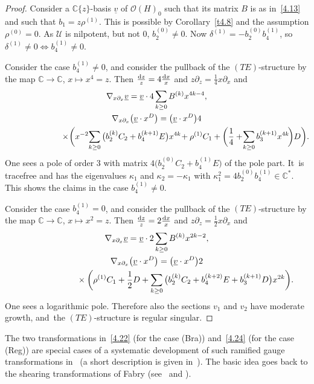 \documentclass[pdftex]{sigma}%
\numberwithin{equation}{section}
\numberwithin{figure}{section}
\newcommand{\C}{{\mathbb C}}
\newcommand{\OO}{{\mathcal O}}
\newcommand{\UU}{{\mathcal U}}
\newcommand{\ddd}{{\rm d}}
\newcommand{\uuuu}{\underline}
\newcommand{\paa}{\partial}
\newcommand{\nnn}{\nabla}
\begin{document}
\begin{proof}
Consider a $\C\{z\}$-basis $\uuuu{v}$ of $\OO(H)_0$
such that its matrix $B$ is as in~\eqref{4.13}
and such that $b_1=z\rho^{(1)}$. This is possible
by Corollary~\ref{t4.8} and the assumption $\rho^{(0)}=0$.
As $\UU$ is nilpotent, but not 0, $b_2^{(0)}\neq 0$.
Now $\delta^{(1)}=-b_2^{(0)}b_4^{(1)}$, so
$\delta^{(1)}\neq 0\iff b_4^{(1)}\neq 0$.

Consider the case $b_4^{(1)}\neq 0$, and consider
the pullback of the $(TE)$-structure by the map
$\C\to\C$, $x\mapsto x^4=z$.
Then $\frac{\ddd z}{z}=4\frac{\ddd x}{x}$ and
$z\paa_z=\frac{1}{4}x\paa_x$ and
\begin{gather}%
\nnn_{x\paa_x}\uuuu{v}=
\uuuu{v}\cdot 4\sum_{k\geq 0}B^{(k)}x^{4k-4},\nonumber
\\
\nnn_{x\paa_x}\big(\uuuu{v}\cdot x^D\big)=
\big(\uuuu{v}\cdot x^D\big)4\nonumber
\\ \hphantom{\nnn_{x\paa_x}\big(\uuuu{v}\cdot x^D\big)=}
{}\times\!\bigg(x^{-2}\!\sum_{k\geq 0}\big(b_2^{(k)}C_2+b_4^{(k+1)}E\big)x^{4k}
\!+\rho^{(1)}C_1+\bigg(\frac{1}{4}
+\!\sum_{k\geq 0}b_3^{(k+1)}x^{4k}\!\bigg)D\bigg).\!\label{4.22}
\end{gather}
One sees a pole of order 3 with matrix
$4\big(b_2^{(0)}C_2+b_4^{(1)}E\big)$ of the pole part. It~is tracefree and has the eigenvalues
$\kappa_1$ and $\kappa_2=-\kappa_1$ with
$\kappa_1^2=4b_2^{(0)}b_4^{(1)}\in\C^*$.
This shows the claims in the case $b_4^{(1)}\neq 0$.

Consider the case $b_4^{(1)}= 0$, and consider
the pullback of the $(TE)$-structure by the map
$\C\to\C$, $x\mapsto x^2=z$.
Then $\frac{\ddd z}{z}=2\frac{\ddd x}{x}$ and
$z\paa_z=\frac{1}{2}x\paa_x$ and
\begin{gather}%
\nnn_{x\paa_x}\uuuu{v}=
\uuuu{v}\cdot 2\sum_{k\geq 0}B^{(k)}x^{2k-2},\nonumber
\\
\nnn_{x\paa_x}\big(\uuuu{v}\cdot x^D\big)=\nonumber
\big(\uuuu{v}\cdot x^D\big)2
\\ \hphantom{\nnn_{x\paa_x}\big(\uuuu{v}\cdot x^D\big)=}
{}\times\bigg(\rho^{(1)}C_1 + \frac{1}{2}D
+\sum_{k\geq 0}
\big(b_2^{(k)}C_2+b_4^{(k+2)}E+b_3^{(k+1)}D\big)x^{2k}\bigg).\label{4.24}
\end{gather}
One sees a logarithmic pole. Therefore also the
sections $v_1$ and $v_2$ have moderate growth,
and~the $(TE)$-structure is regular singular.
\end{proof}


\begin{Remark}%
The two transformations in~\eqref{4.22}
(for the case (Bra)) and~\eqref{4.24} (for the case (Reg))
are special cases of a systematic development of such
ramified gauge transformations in~\cite{BV83}
(a short description is given in~\cite[p.~17]{Va96}).
The basic idea goes back to the shearing transformations
of Fabry (see~\cite{Fa85} and \cite[p.~4]{Va96}).
\end{Remark}
\end{document}
